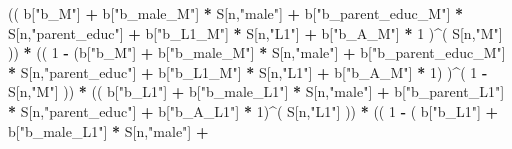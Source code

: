 \documentclass[
]{book}
\newenvironment{Shaded}{\begin{snugshade}}{\end{snugshade}}
\newcommand{\DecValTok}[1]{\textcolor[rgb]{0.00,0.00,0.81}{#1}}
\newcommand{\NormalTok}[1]{#1}
\newcommand{\SpecialCharTok}[1]{\textcolor[rgb]{0.81,0.36,0.00}{\textbf{#1}}}
\newcommand{\StringTok}[1]{\textcolor[rgb]{0.31,0.60,0.02}{#1}}
\begin{document}
\begin{Shaded}
\begin{Highlighting}[]
\NormalTok{                    (( b[}\StringTok{"b\_M"}\NormalTok{] }\SpecialCharTok{+} 
\NormalTok{                           b[}\StringTok{"b\_male\_M"}\NormalTok{] }\SpecialCharTok{*}\NormalTok{ S[n,}\StringTok{"male"}\NormalTok{] }\SpecialCharTok{+} 
\NormalTok{                           b[}\StringTok{"b\_parent\_educ\_M"}\NormalTok{] }\SpecialCharTok{*}\NormalTok{ S[n,}\StringTok{"parent\_educ"}\NormalTok{] }\SpecialCharTok{+} 
\NormalTok{                           b[}\StringTok{"b\_L1\_M"}\NormalTok{] }\SpecialCharTok{*}\NormalTok{ S[n,}\StringTok{"L1"}\NormalTok{] }\SpecialCharTok{+}
\NormalTok{                           b[}\StringTok{"b\_A\_M"}\NormalTok{] }\SpecialCharTok{*} \DecValTok{1}\NormalTok{ )}\SpecialCharTok{\^{}}\NormalTok{( S[n,}\StringTok{"M"}\NormalTok{] )) }\SpecialCharTok{*}
\NormalTok{                    (( }\DecValTok{1} \SpecialCharTok{{-}}\NormalTok{ (b[}\StringTok{"b\_M"}\NormalTok{] }\SpecialCharTok{+} 
\NormalTok{                              b[}\StringTok{"b\_male\_M"}\NormalTok{] }\SpecialCharTok{*}\NormalTok{ S[n,}\StringTok{"male"}\NormalTok{] }\SpecialCharTok{+} 
\NormalTok{                              b[}\StringTok{"b\_parent\_educ\_M"}\NormalTok{] }\SpecialCharTok{*}\NormalTok{ S[n,}\StringTok{"parent\_educ"}\NormalTok{] }\SpecialCharTok{+} 
\NormalTok{                              b[}\StringTok{"b\_L1\_M"}\NormalTok{] }\SpecialCharTok{*}\NormalTok{ S[n,}\StringTok{"L1"}\NormalTok{] }\SpecialCharTok{+}
\NormalTok{                              b[}\StringTok{"b\_A\_M"}\NormalTok{] }\SpecialCharTok{*} \DecValTok{1}\NormalTok{) )}\SpecialCharTok{\^{}}\NormalTok{( }\DecValTok{1} \SpecialCharTok{{-}}\NormalTok{ S[n,}\StringTok{"M"}\NormalTok{] )) }\SpecialCharTok{*}
\NormalTok{                        (( b[}\StringTok{"b\_L1"}\NormalTok{] }\SpecialCharTok{+}
\NormalTok{                             b[}\StringTok{"b\_male\_L1"}\NormalTok{] }\SpecialCharTok{*}\NormalTok{ S[n,}\StringTok{"male"}\NormalTok{] }\SpecialCharTok{+}  
\NormalTok{                             b[}\StringTok{"b\_parent\_L1"}\NormalTok{] }\SpecialCharTok{*}\NormalTok{ S[n,}\StringTok{"parent\_educ"}\NormalTok{] }\SpecialCharTok{+}
\NormalTok{                             b[}\StringTok{"b\_A\_L1"}\NormalTok{] }\SpecialCharTok{*} \DecValTok{1}\NormalTok{)}\SpecialCharTok{\^{}}\NormalTok{( S[n,}\StringTok{"L1"}\NormalTok{] )) }\SpecialCharTok{*}
\NormalTok{                        (( }\DecValTok{1} \SpecialCharTok{{-}}\NormalTok{ ( b[}\StringTok{"b\_L1"}\NormalTok{] }\SpecialCharTok{+}
\NormalTok{                                   b[}\StringTok{"b\_male\_L1"}\NormalTok{] }\SpecialCharTok{*}\NormalTok{ S[n,}\StringTok{"male"}\NormalTok{] }\SpecialCharTok{+}  

\end{Highlighting}
\end{Shaded}
\end{document}
